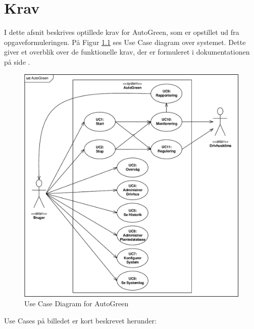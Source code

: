 \chapter{Krav}
\label{ch:Krav}

I dette afsnit beskrives optillede krav for AutoGreen, som er opstillet ud fra opgaveformuleringen. 
På Figur \ref{fig:use_case_diagram} ses Use Case diagram over systemet. Dette giver et overblik over de funktionelle krav, der er formuleret i dokumentationen på side \pageref{P-ch:Kravspec}.

\begin{figure}[h]
\centering 
\includegraphics[width={\textwidth-1cm}, trim=0 0 0 0, clip=true] {../fig/UC_Diagram.pdf}
\caption{Use Case Diagram for AutoGreen}
\label{fig:use_case_diagram}
\end{figure}

Use Cases på billedet er kort beskrevet herunder:

